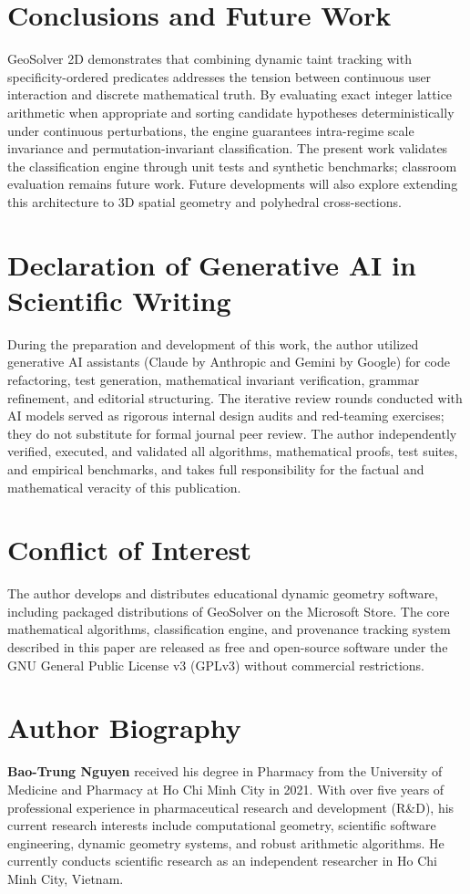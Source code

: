 \documentclass[preprint,12pt]{elsarticle}
\begin{document}
\section{Conclusions and Future Work}
GeoSolver 2D demonstrates that combining dynamic taint tracking with specificity-ordered predicates addresses the tension between continuous user interaction and discrete mathematical truth. By evaluating exact integer lattice arithmetic when appropriate and sorting candidate hypotheses deterministically under continuous perturbations, the engine guarantees intra-regime scale invariance and permutation-invariant classification. The present work validates the classification engine through unit tests and synthetic benchmarks; classroom evaluation remains future work. Future developments will also explore extending this architecture to 3D spatial geometry and polyhedral cross-sections.

\section*{Declaration of Generative AI in Scientific Writing}
During the preparation and development of this work, the author utilized generative AI assistants (Claude by Anthropic and Gemini by Google) for code refactoring, test generation, mathematical invariant verification, grammar refinement, and editorial structuring. The iterative review rounds conducted with AI models served as rigorous internal design audits and red-teaming exercises; they do not substitute for formal journal peer review. The author independently verified, executed, and validated all algorithms, mathematical proofs, test suites, and empirical benchmarks, and takes full responsibility for the factual and mathematical veracity of this publication.

\section*{Conflict of Interest}
The author develops and distributes educational dynamic geometry software, including packaged distributions of GeoSolver on the Microsoft Store. The core mathematical algorithms, classification engine, and provenance tracking system described in this paper are released as free and open-source software under the GNU General Public License v3 (GPLv3) without commercial restrictions.

\section*{Author Biography}
\textbf{Bao-Trung Nguyen} received his degree in Pharmacy from the University of Medicine and Pharmacy at Ho Chi Minh City in 2021. With over five years of professional experience in pharmaceutical research and development (R\&D), his current research interests include computational geometry, scientific software engineering, dynamic geometry systems, and robust arithmetic algorithms. He currently conducts scientific research as an independent researcher in Ho Chi Minh City, Vietnam.
\end{document}
